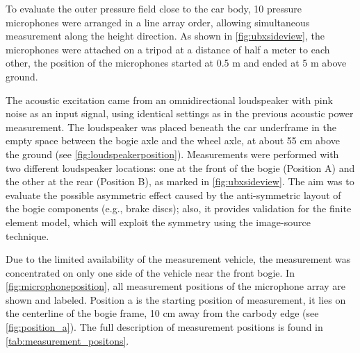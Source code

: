 To evaluate the outer pressure field close to the car body, 10 pressure microphones were arranged in a line array order, allowing simultaneous measurement along the height direction. As shown in \cref{fig:ubxsideview}, the microphones were attached on a tripod at a distance of half a meter to each other, the position of the microphones started at 0.5 m and ended at 5 m above ground.

The acoustic excitation came from an omnidirectional loudspeaker with pink noise as an input signal, using identical settings as in the previous acoustic power measurement. The loudspeaker was placed beneath the car underframe in the empty space between the bogie axle and the wheel axle, at about 55 cm above the ground (see \cref{fig:loudspeakerposition}). Measurements were performed with two different loudspeaker locations: one at the front of the bogie (Position A) and the other at the rear (Position B), as marked in \cref{fig:ubxsideview}. The aim was to evaluate the possible asymmetric effect caused by the anti-symmetric layout of the bogie components (e.g., brake discs); also, it provides validation for the finite element model, which will exploit the symmetry using the image-source technique.

Due to the limited availability of the measurement vehicle, the measurement was concentrated on only one side of the vehicle near the front bogie. In \cref{fig:microphoneposition}, all measurement positions of the microphone array are shown and labeled. Position a is the starting position of measurement, it lies on the centerline of the bogie frame, 10 cm away from the carbody edge (see \cref{fig:position_a}). The full description of measurement positions is found in \cref{tab:measurement_positons}.

